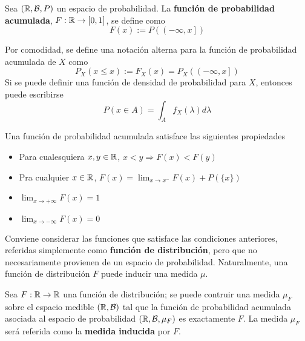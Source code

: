 \begin{definicion}%
Sea $(\mathbb{R},\mathcal{B},P)$ un espacio de probabilidad. La \textbf{función de probabilidad acumulada}, $F : \mathbb{R} \rightarrow [0,1]$, se define como
\begin{equation*}
F (x) := P\left( \left(-\infty,x \right] \right)
\end{equation*}
\end{definicion}

Por comodidad, se define una notación alterna para la función de probabilidad acumulada de $X$ como
\begin{equation}
P_X(x\leq x) := F_X(x) = P_X\left( \left( -\infty,x \right] \right)
\end{equation}
Si se puede definir una función de densidad de probabilidad para $X$, entonces puede escribirse
\begin{equation}
P(x\in A) = \int_A f_X(\lambda) d\lambda 
\end{equation}

Una función de probabilidad acumulada satisface las siguientes propiedades
\begin{itemize}
\item Para cualesquiera $x,y\in \mathbb{R}$, $x < y \Rightarrow F(x) < F(y)$
\item Pra cualquier $x\in\mathbb{R}$, $F(x) = \lim_{x\rightarrow x^{-}} F(x) + P(\{x\})$
\item $\lim_{x\rightarrow +\infty} F(x) = 1$
\item $\lim_{x\rightarrow -\infty} F(x) = 0$
\end{itemize}

Conviene considerar las funciones que satisface las condiciones anteriores, referidas simplemente como \textbf{función de distribución}, pero que no necesariamente provienen de un espacio de probabilidad. Naturalmente, una función de distribución $F$ puede inducir una medida $\mu$.

\begin{proposicion}
Sea $F:\mathbb{R} \rightarrow \mathbb{R}$ una función de distribución; se puede contruir una medida $\mu_F$ sobre el espacio medible $(\mathbb{R}, \mathcal{B})$ tal que la función de probabilidad acumulada asociada al espacio de probabilidad $(\mathbb{R}, \mathcal{B}, \mu_F)$ es exactamente $F$.
%
La medida $\mu_F$ será referida como la \textbf{medida inducida} por $F$.
\end{proposicion}

